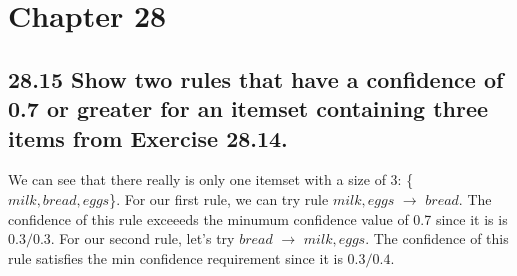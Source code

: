 \section*{Chapter 28}


\subsection*{28.15 Show two rules that have a confidence of 0.7 or greater for an itemset containing three items from Exercise 28.14.}

We can see that there really is only one itemset with a size of 3: \{$milk, bread, eggs$\}. For our first rule, we can try rule $milk, eggs$ $\rightarrow$ $bread$. The confidence of this rule exceeeds the minumum confidence value of 0.7 since it is is $0.3/0.3$. For our second rule, let's try $bread$ $\rightarrow$ $milk, eggs$. The confidence of this rule satisfies the min confidence requirement since it is $0.3/0.4$.